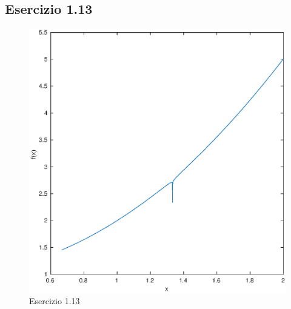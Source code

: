 \documentclass[11pt]{extarticle}
\begin{document}
\subsection{Esercizio 1.13}
\begin{figure}[h]
\caption{Esercizio 1.13}
\label{fes113}
\includegraphics[width=\textwidth]{plot/fes113}
\end{figure}
\end{document}

